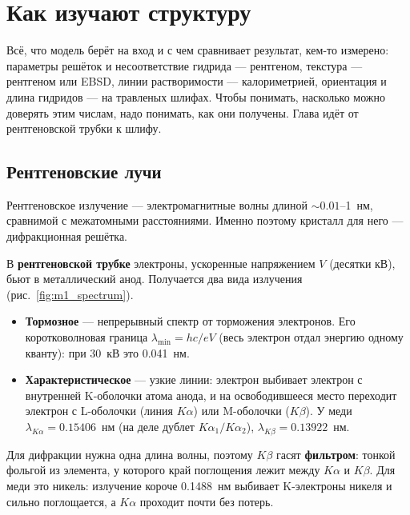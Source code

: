 \chapter{Как изучают структуру}\label{ch:methods}

Всё, что модель берёт на вход и с чем сравнивает результат, кем-то измерено: параметры решёток и несоответствие
гидрида --- рентгеном, текстура --- рентгеном или EBSD, линии растворимости --- калориметрией, ориентация и длина
гидридов --- на травленых шлифах. Чтобы понимать, насколько можно доверять этим числам, надо понимать, как они
получены. Глава идёт от рентгеновской трубки к шлифу.

\section{Рентгеновские лучи}

Рентгеновское излучение --- электромагнитные волны длиной $\sim0.01$--1~нм, сравнимой с межатомными расстояниями.
Именно поэтому кристалл для него --- дифракционная решётка.

В \textbf{рентгеновской трубке} электроны, ускоренные напряжением $V$ (десятки кВ), бьют в металлический анод. Получается
два вида излучения (рис.~\ref{fig:m1_spectrum}).
\begin{itemize}
\item \textbf{Тормозное} --- непрерывный спектр от торможения электронов. Его коротковолновая граница
  $\lambda_{\min} = hc/eV$ (весь электрон отдал энергию одному кванту): при 30~кВ это 0.041~нм.
\item \textbf{Характеристическое} --- узкие линии: электрон выбивает электрон с внутренней K-оболочки атома анода,
  и на освободившееся место переходит электрон с L-оболочки (линия $K\alpha$) или M-оболочки ($K\beta$). У меди
  $\lambda_{K\alpha} = 0.15406$~нм (на деле дублет $K\alpha_1/K\alpha_2$), $\lambda_{K\beta} = 0.13922$~нм.
\end{itemize}
Для дифракции нужна одна длина волны, поэтому $K\beta$ гасят \textbf{фильтром}: тонкой фольгой из элемента, у
которого край поглощения лежит между $K\alpha$ и $K\beta$. Для меди это никель: излучение короче 0.1488~нм выбивает
K-электроны никеля и сильно поглощается, а $K\alpha$ проходит почти без потерь.


